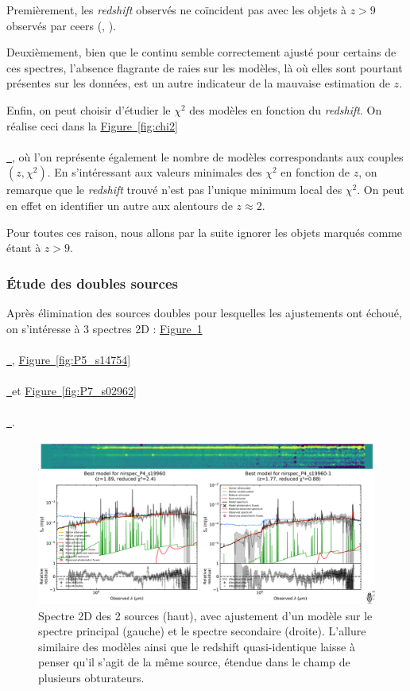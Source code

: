 \documentclass[12pt, a4paper]{article}
\newcommand*{\figref}[2][]{%
  \hyperref[{#2}]{%
    Figure~\ref*{#2}%
    \ifx\\#1\\%
    \else
      \,#1%
    \fi
  }%
}
\begin{document}
Premièrement, les \textit{redshift} observés ne coïncident pas avec les objets à $z > 9$ observés par \gls{ceers} (\cite{2024ApJ...969L...2F}, \cite{ceers_high_redshift}).

Deuxièmement, bien que le continu semble correctement ajusté pour certains de ces spectres, l'absence flagrante de raies sur les modèles, là où elles sont pourtant présentes sur les données, est un autre indicateur de la mauvaise estimation de $z$.

Enfin, on peut choisir d'étudier le $\chi^2$ des modèles en fonction du \textit{redshift}. On réalise ceci dans la \figref{fig:chi2}, où l'on représente également le nombre de modèles correspondants aux couples $(z,\chi^2)$. En s'intéressant aux valeurs minimales des $\chi^2$ en fonction de $z$, on remarque que le \textit{redshift} trouvé n'est pas l'unique minimum local des $\chi^2$. On peut en effet en identifier un autre aux alentours de $z \approx 2$.

Pour toutes ces raison, nous allons par la suite ignorer les objets marqués comme étant à $z > 9$.

\subsubsection{Étude des doubles sources}

Après élimination des sources doubles pour lesquelles les ajustements ont échoué, on s'intéresse à 3 spectres 2D : \figref{fig:P4_s19960}, \figref{fig:P5_s14754} et \figref{fig:P7_s02962}.

\begin{figure}[!h]
  \centering
  \includegraphics[width=1\textwidth]{assets/double_P4_s19960.png}
  \caption{Spectre 2D des 2 sources (haut), avec ajustement d'un modèle sur le spectre principal (gauche) et le spectre secondaire (droite). L'allure similaire des modèles ainsi que le redshift quasi-identique laisse à penser qu'il s'agit de la même source, étendue dans le champ de plusieurs obturateurs.}
  \label{fig:P4_s19960}
\end{figure}
\end{document}
